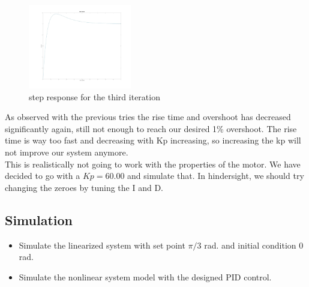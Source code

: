 \documentclass[12pt]{article}
\begin{document}
\begin{figure}[H]
  \centering
  \includegraphics[width=0.4\textwidth]{images/kp_60_2.jpg}
  \caption{step response for the third iteration} \label{my_third_step}
\end{figure}
As observed with the previous tries the rise time and overshoot has decreased significantly again, still not enough to reach our desired 1\% overshoot. The rise time is way too fast and decreasing with Kp increasing, so increasing the kp will not improve our system anymore. \\
This is realistically not going to work with the properties of the motor. We have decided to go with a $Kp = 60.00$ and simulate that. In hindersight, we should try changing the zeroes by tuning the I and D.


\subsection*{Simulation}

\begin{itemize}
  \item Simulate the linearized system with set point $\pi/3$ rad. and initial condition 0 rad.
  \item Simulate the nonlinear system model with the designed PID control.
\end{itemize}
\end{document}
